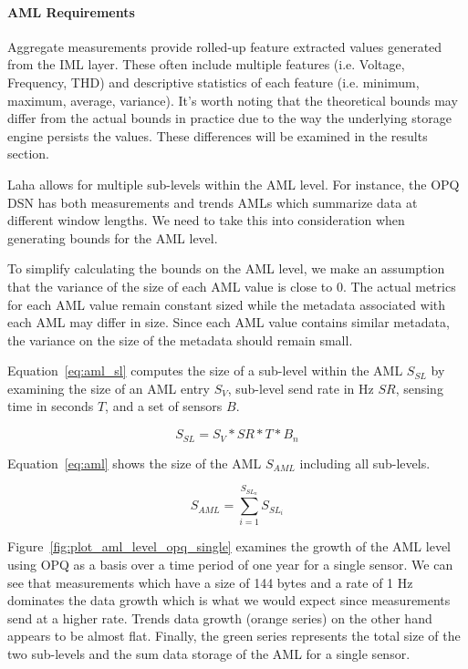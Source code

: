\paragraph{AML Requirements}
Aggregate measurements provide rolled-up feature extracted values generated from the IML layer. These often include multiple features (i.e. Voltage, Frequency, THD) and descriptive statistics of each feature (i.e. minimum, maximum, average, variance). It's worth noting that the theoretical bounds may differ from the actual bounds in practice due to the way the underlying storage engine persists the values. These differences will be examined in the results section.

Laha allows for multiple sub-levels within the AML level. For instance, the OPQ DSN has both measurements and trends AMLs which summarize data at different window lengths. We need to take this into consideration when generating bounds for the AML level.

To simplify calculating the bounds on the AML level, we make an assumption that the variance of the size of each AML value is close to 0. The actual metrics for each AML value remain constant sized while the metadata associated with each AML may differ in size. Since each AML value contains similar metadata, the variance on the size of the metadata should remain small.

Equation~\ref{eq:aml_sl} computes the size of a sub-level within the AML $S_{SL}$ by examining the size of an AML entry $S_{V}$, sub-level send rate in Hz $SR$, sensing time in seconds $T$, and a set of sensors $B$.

\begin{equation}\label{eq:aml_sl}
	S_{SL} = S_{V} * SR * T * B_{n}
\end{equation}

Equation~\ref{eq:aml} shows the size of the AML $S_{AML}$ including all sub-levels.

\begin{equation}\label{eq:aml}
	S_{AML} = \sum_{i=1}^{S_{SL_{n}}} S_{SL_{i}}
\end{equation}

Figure~\ref{fig:plot_aml_level_opq_single} examines the growth of the AML level using OPQ as a basis over a time period of one year for a single sensor. We can see that measurements which have a size of 144 bytes and a rate of 1 Hz dominates the data growth which is what we would expect since measurements send at a higher rate. Trends data growth (orange series) on the other hand appears to be almost flat. Finally, the green series represents the total size of the two sub-levels and the sum data storage of the AML for a single sensor.


